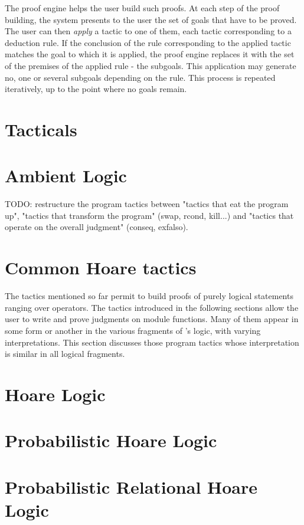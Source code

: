 The \EasyCrypt proof engine helps the user build such proofs. At each step
of the proof building, the system presents to the user the set of goals
that have to be proved. The user can then \emph{apply} a tactic to one of
them, each tactic corresponding to a deduction rule. If the conclusion
of the rule corresponding to the applied tactic matches the goal to which
it is applied, the proof engine replaces it with the set of the
premises of the applied rule - the subgoals. This application may generate
no, one or several subgoals depending on the rule. This process is repeated
iteratively, up to the point where no goals remain.

\section{Tacticals}



\section{Ambient Logic}


TODO: restructure the program tactics between "tactics that eat the program up", "tactics that transform the program" (swap, rcond, kill...) and "tactics that operate on the overall judgment" (conseq, exfalso).

\section{Common Hoare tactics}
The tactics mentioned so far permit to build proofs of purely logical statements
ranging over operators. The tactics introduced in the following sections allow
the user to write and prove judgments on module functions. Many of them
appear in some form or another in the various fragments of \EasyCrypt's logic,
with varying interpretations. This section discusses those program tactics whose
interpretation is similar in all logical fragments.


\section{Hoare Logic}


\section{Probabilistic Hoare Logic}


\section{Probabilistic Relational Hoare Logic}



